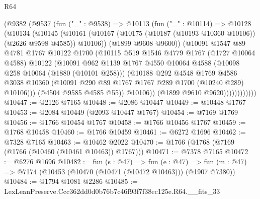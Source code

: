 \begin{lexlean}{R64}
\begin{coremodule}
                  (@9382
                    (@9537
                      (fun ("_" : @9538) =>
                      @10113
                        (fun ("_" : @10114) =>
                        @10128
                          (@10134
                            (@10145
                              (@10161
                                (@10167
                                  (@10175 (@10187 (@10193 @10360 @10106)) (@2626 @9598 @4585))
                                  @10106))
                              (@1899 @9608 @9600))
                            (@10091
                              @1547
                              @89
                              @4781
                              @1767
                              @10122
                              @1700
                              (@10115
                                @519
                                @1546
                                @4779
                                @1767
                                (@1727 @10064 @4588)
                                @10122
                                (@10091
                                  @962
                                  @1139
                                  @1767
                                  @4550
                                  @10064
                                  @4588
                                  (@10098 @258 @10064 (@1880 (@10101 @258)))
                                  (@10188
                                    @292
                                    @4548
                                    @1769
                                    @4586
                                    @3038
                                    @10360
                                    (@10091 @290 @89 @1767 @1767 @289 @1700 (@10240 @289) @10106)))
                                (@4504 @9585 @4585 @55))
                              @10106))
                          (@1899 @9610 @9620))))))))))))
@10447 := @2126 @7165
@10448 := @2086 @10447
@10449 := @10448 @1767
@10453 := @2084 @10449 (@2093 @10447 @1767)
@10454 := @7169 @1769
@10456 := @1766 @10454 @1767
@10458 := @1766 @10456 @1767
@10459 := @1768 @10458
@10460 := @1766 @10459
@10461 := @6272 @1696
@10462 := @7328 @7165
@10463 := @10462 @2022
@10470 := @1766 (@1768 (@7169 (@1766 (@10460 (@10461 @10463)) @1767)))
@10471 := @7378 @7165
@10472 := @6276 @1696
@10482 := fun (s : @47) =>
  fun (e : @47) => fun (m : @47) => @7174 (@10453 (@10470 (@10471 (@10472 @10463))) (@1907 @7380))
@10484 := @1794 @1081 @2286
@10485 := LexLeanPreserve.Ccc362dd0d0b76b7c46f93f7f38ec125e.R64.__fits_33

\end{coremodule}
\end{lexlean}

